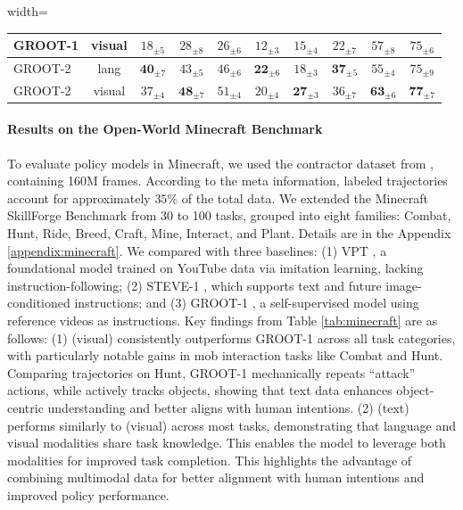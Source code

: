 \begin{table}[]
\begin{adjustbox}{width=\linewidth}
\begin{tabular}{@{}lccccccccc@{}}
GROOT-1          & visual & $18_{\pm 5}$                    & $28_{\pm 8}$                  & $26_{\pm 6}$                 & $12_{\pm 3}$                 & $15_{\pm 4}$                   & $22_{\pm 7}$                  & $57_{\pm 8}$                      & $75_{\pm 6}$                   \\ \midrule
GROOT-2          & lang & $\mathbf{40}_{\pm 7}$                    & $43_{\pm 5}$                  & $46_{\pm 6}$                 & $\mathbf{22}_{\pm 6}$                 & $18_{\pm 3}$                   & $\mathbf{37}_{\pm 5}$                  & $55_{\pm 4}$                      & $75_{\pm 9}$                   \\
GROOT-2          & visual & $37_{\pm 4}$                    & $\mathbf{48}_{\pm 7}$                  & $51_{\pm 4}$                 & $20_{\pm 4}$                 & $\mathbf{27}_{\pm 3}$                   & $36_{\pm 7}$                  & $\mathbf{63}_{\pm 6}$                      & $\mathbf{77}_{\pm 7}$                   \\ \bottomrule
\end{tabular}
\end{adjustbox}
\end{table}

\paragraph{Results on the Open-World Minecraft Benchmark}
To evaluate policy models in Minecraft, we used the contractor dataset from \citet{vpt}, containing 160M frames. According to the meta information, labeled trajectories account for approximately $35\%$ of the total data. We extended the Minecraft SkillForge Benchmark \citep{groot1} from 30 to 100 tasks, grouped into eight families: Combat, Hunt, Ride, Breed, Craft, Mine, Interact, and Plant. Details are in the Appendix \ref{appendix:minecraft}. 
We compared \agent with three baselines: (1) VPT \citep{vpt}, a foundational model trained on YouTube data via imitation learning, lacking instruction-following; (2) STEVE-1 \citep{steve1}, which supports text and future image-conditioned instructions; and (3) GROOT-1 \citep{groot1}, a self-supervised model using reference videos as instructions. 
Key findings from Table \ref{tab:minecraft} are as follows: (1) \agent (visual) consistently outperforms GROOT-1 across all task categories, with particularly notable gains in mob interaction tasks like Combat and Hunt. Comparing trajectories on Hunt, GROOT-1 mechanically repeats “attack” actions, while \agent actively tracks objects, showing that text data enhances object-centric understanding and better aligns with human intentions. (2) \agent (text) performs similarly to \agent (visual) across most tasks, demonstrating that language and visual modalities share task knowledge. This enables the model to leverage both modalities for improved task completion. 
This highlights the advantage of combining multimodal data for better alignment with human intentions and improved policy performance.


